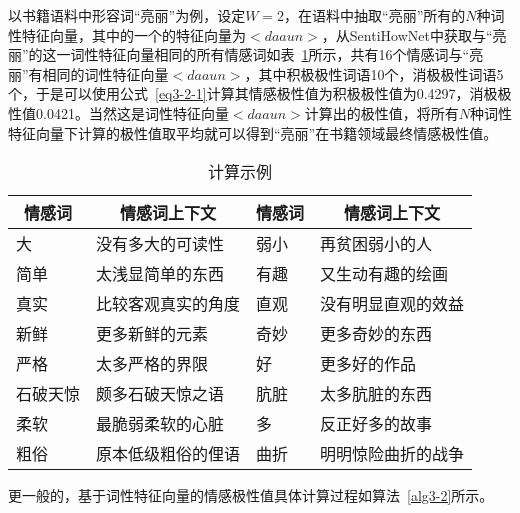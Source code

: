 以书籍语料中形容词“亮丽”为例，设定$ W=2 $，在语料中抽取“亮丽”所有的$ N $种词性特征向量，其中的一个的特征向量为$ <daaun> $，从SentiHowNet中获取与“亮丽”的这一词性特征向量相同的所有情感词如表~\ref{tab3-3-1}所示，共有16个情感词与“亮丽”有相同的词性特征向量$ <daaun> $，其中积极极性词语10个，消极极性词语5个，于是可以使用公式~\ref{eq3-2-1}计算其情感极性值为积极极性值为0.4297，消极极性值0.0421。当然这是词性特征向量$ <daaun> $计算出的极性值，将所有$ N $种词性特征向量下计算的极性值取平均就可以得到“亮丽”在书籍领域最终情感极性值。
\begin{table}[htp]
\centering
\caption{计算示例}
\label{tab3-3-1}
\begin{tabular}{|l|l|l|l|}
\hline
\multicolumn{1}{|c|}{情感词} & \multicolumn{1}{c|}{情感词上下文} & \multicolumn{1}{c|}{情感词} & \multicolumn{1}{c|}{情感词上下文} \\ \hline
大 & 没有多大的可读性 & 弱小 & 再贫困弱小的人 \\ \hline
简单 & 太浅显简单的东西 & 有趣 & 又生动有趣的绘画 \\ \hline
真实 & 比较客观真实的角度 & 直观 & 没有明显直观的效益 \\ \hline
新鲜 & 更多新鲜的元素 & 奇妙 & 更多奇妙的东西 \\ \hline
严格 & 太多严格的界限 & 好 & 更多好的作品 \\ \hline
石破天惊 & 颇多石破天惊之语 & 肮脏 & 太多肮脏的东西 \\ \hline
柔软 & 最脆弱柔软的心脏 & 多 & 反正好多的故事 \\ \hline
粗俗 & 原本低级粗俗的俚语 & 曲折 & 明明惊险曲折的战争 \\ \hline
\end{tabular}
\end{table}


更一般的，基于词性特征向量的情感极性值具体计算过程如算法~\ref{alg3-2}所示。

